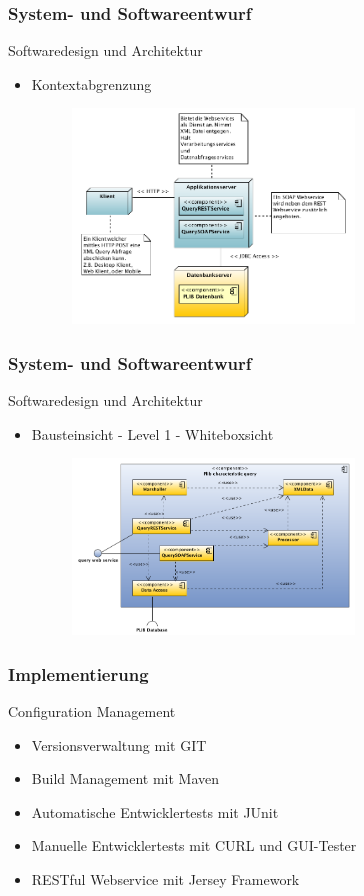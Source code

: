 \documentclass[serif,mathserif]{beamer}
\begin{document}
\begin{frame}
  \frametitle{System- und Softwareentwurf}
  Softwaredesign und Architektur
  \begin{itemize}
  \item Kontextabgrenzung
     \begin{figure}[t]
     \includegraphics[width=7.5cm]{images/bausteinsicht_plib_level0.png}
     \end{figure}
  \end{itemize}
 \end{frame}
 
 \begin{frame}
  \frametitle{System- und Softwareentwurf}
  Softwaredesign und Architektur
  \begin{itemize}
  \item Bausteinsicht - Level 1 - Whiteboxsicht 
     \begin{figure}[t]
     \includegraphics[width=7.5cm]{images/bausteinsicht_plib_level1.png}
     \end{figure}
  \end{itemize}
 \end{frame}

\begin{frame}
  \frametitle{Implementierung}
  Configuration Management
  \begin{itemize}
  \item Versionsverwaltung mit GIT
  \item Build Management mit Maven
  \item Automatische Entwicklertests mit JUnit
  \item Manuelle Entwicklertests mit CURL und GUI-Tester
  \item RESTful Webservice mit Jersey Framework
  \end{itemize}
\end{frame}
\end{document}
